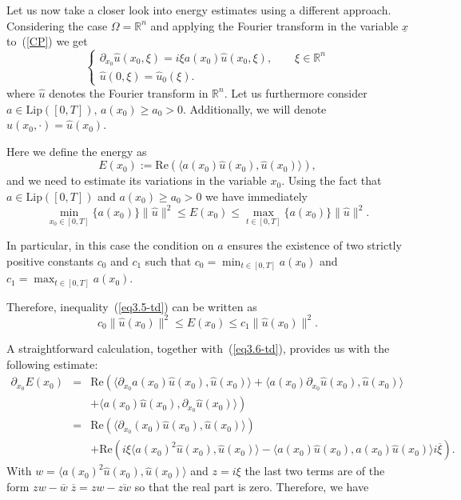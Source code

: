 \documentclass[12pt]{amsart}
\theoremstyle{definition}
\newcommand{\R}{\mathbb{R}}
\newcommand{\un}{\underline}
\begin{document}
Let us now take a closer look into energy estimates using a different approach. Considering the case $\Omega=\R^n$ and applying the Fourier transform in the variable $\un{x}$ to~(\ref{CP}) we get
\begin{equation}
\begin{cases}
\partial_{x_0}\hat{u}(x_0,\xi) = i\xi a(x_0)\hat{u}(x_0,\xi), \qquad \xi\in\R^n\\
\hat{u}(0,\xi) = \hat{u}_0(\xi).
\end{cases}
\label{eq3.4-td}
\end{equation}
where $\hat{u}$ denotes the Fourier transform in $\R^n$. Let us furthermore consider $a \in \text{Lip}([0, T]), \, a(x_0) \geq a_0 > 0$. Additionally, we will denote $\hat{u}(x_0,\cdot)=\hat{u}(x_0)$.

Here we define the energy as
\[
E(x_0) := \mathrm{Re}\left(\langle a(x_0)\hat{u}(x_0), \hat{u}(x_0) \rangle\right),
\]
and we need to estimate its variations in the variable $x_0$. Using the fact that $a \in \text{Lip}([0, T])$ and $a(x_0) \geq a_0 > 0$ we have immediately
\begin{equation}
\min_{x_0 \in [0,T]} \{a(x_0)\}\|\hat{u}\|^2\leq E(x_0) \leq \max_{t \in [0,T]} \{a(x_0)\} \|\hat{u}\|^2 .
\label{eq3.5-td}
\end{equation}

In particular, in this case the condition on $a$ ensures the existence of two strictly positive constants $c_0 $ and $ c_1 $ such that $ c_0 = \min_{t \in [0,T]} a(x_0) $ and $ c_1 = \max_{t \in [0,T]} a(x_0) $.

Therefore, inequality~(\ref{eq3.5-td}) can be written as
\begin{equation}
c_0 \|\hat{u}(x_0)\|^2 \leq E(x_0) \leq c_1 \|\hat{u}(x_0)\|^2.
\label{eq3.6-td}
\end{equation}

A straightforward calculation, together with~(\ref{eq3.6-td}), provides us with the following estimate:
\begin{eqnarray*}
\partial_{x_0}E(x_0) & = & \mathrm{Re}\left(\langle \partial_{x_0}a(x_0)\hat{u}(x_0), \hat{u}(x_0) \rangle + \langle a(x_0)\partial_{x_0}\hat{u}(x_0), \hat{u}(x_0)\right. \rangle\\
&&  \left. + \langle a(x_0)\hat{u}(x_0), \partial_{x_0}\hat{u}(x_0) \rangle \right)\\
& = & \mathrm{Re}\left(\langle \partial_{x_0}(x_0)\hat{u}(x_0), \hat{u}(x_0) \rangle \right)\\
&& +  \mathrm{Re}\left(i\xi\langle a(x_0)^2\hat{u}(x_0), \hat{u}(x_0) \rangle - \langle a(x_0)\hat{u}(x_0), a(x_0)\hat{u}(x_0) \rangle i\overline{\xi}\right).
\end{eqnarray*}
With $w=\langle a(x_0)^2\hat{u}(x_0), \hat{u}(x_0) \rangle$ and $z=i\xi$ the last two terms are of the form $zw-\overline{w}\;\overline{z}=zw-\overline{zw}$ so that the real part is zero. Therefore, we have
\end{document}
